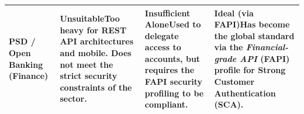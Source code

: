 \documentclass[../memoire.tex]{subfiles}
\begin{document}
\begin{table}[H]
{\begin{tabularx}{\textwidth}{@{}>{\raggedright\arraybackslash}p{3.2cm}XXX@{}}
        \textbf{PSD / Open Banking (Finance)} & 
        \textbf{Unsuitable}\newline Too heavy for REST API architectures and mobile. Does not meet the strict security constraints of the sector. & 
        \textbf{Insufficient Alone}\newline Used to delegate access to accounts, but requires the \textbf{FAPI} security profiling to be compliant. & 
        \textbf{Ideal (via FAPI)}\newline Has become the global standard via the \textit{Financial-grade API} (FAPI) profile for Strong Customer Authentication (SCA). \\ \bottomrule

    \end{tabularx}
}
\end{table}

\end{document}
